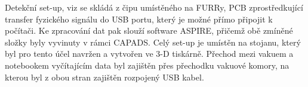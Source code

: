 
Detekční set-up, viz  se skládá z čipu umístěného na FURRy, PCB zprostředkující transfer fyzického signálu do USB portu, který je možné přímo připojit k počítači. Ke zpracování dat pak slouží software ASPIRE, přičemž obě zmíněné složky byly vyvinuty v rámci CAPADS. Celý set-up je umístěn na stojanu, který byl pro tento účel navržen a vytvořen ve 3-D tiskárně. Přechod mezi vakuem a notebookem vyčítajícím data byl zajištěn přes přechodku vakuové komory, na kterou byl z obou stran zajištěn rozpojený USB kabel.


\label{chapter2}

\clearpage \pagebreak \newpage